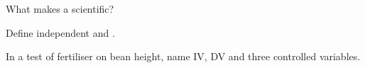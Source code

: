 \begin{exercise}[$\star$]\label{exo:g6:method:3}
What makes a  scientific?
\end{exercise}

\begin{exercise}[$\star$]\label{exo:g6:method:4}
Define independent and .
\end{exercise}

\begin{exercise}[$\star\star$]\label{exo:g6:method:5}
In a test of fertiliser on bean height, name IV, DV and three controlled
variables.
\end{exercise}

